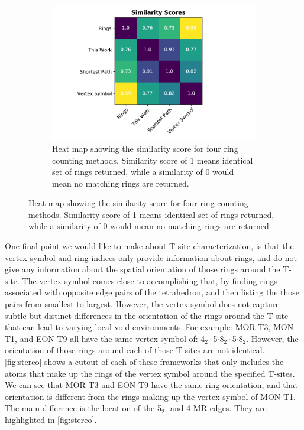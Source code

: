 \documentclass[preprint,numrefs,noinfo,sort&compress]{elsarticle}
\begin{document}
\begin{figure}
\begin{figure}[H]
\centering
\includegraphics[width=\textwidth]{figures/chapter-3/similarity-heat-map.pdf}
\caption{Heat map showing the similarity score for four ring counting methods. Similarity score of 1 means identical set of rings returned, while a similarity of 0 would mean no matching rings are returned. \label{fig:similarity}}
\end{figure}
\end{figure}

One final point we would like to make about T-site characterization, is that the vertex symbol and ring indices only provide information about rings, and do not give any information about the spatial orientation of those rings around the T-site. The vertex symbol comes close to accomplishing that, by finding rings associated with opposite edge pairs of the tetrahedron, and then listing the those pairs from smallest to largest. However, the vertex symbol does not capture subtle but distinct differences in the orientation of the rings around the T-site that can lead to varying local void environments. For example: MOR T3, MON T1, and EON T9 all have the same vertex symbol of: 4\(_{\text{2}} \cdot\)5\(\cdot\)8\(_{\text{2}} \cdot\)5\(\cdot\)8\(_{\text{2}}\). However, the orientation of those rings around each of those T-sites are not identical. \cref{fig:stereo} shows a cutout of each of these frameworks that only includes the atoms that make up the rings of the vertex symbol around the specified T-sites. We can see that MOR T3 and EON T9 have the same ring orientation, and that orientation is different from the rings making up the vertex symbol of MON T1. The main difference is the location of the 5\(_{\text{2}}\)- and 4-MR edges. They are highlighted in \cref{fig:stereo}.
\end{document}
